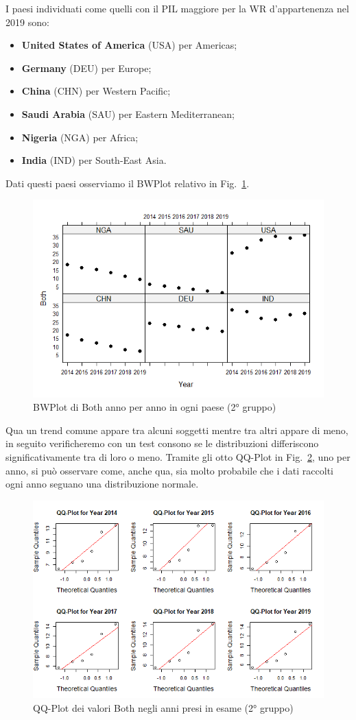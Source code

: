 \documentclass[conference]{IEEEtran}
\begin{document}
I paesi individuati come quelli con il PIL maggiore \cite{b6} per la WR
d'appartenenza nel 2019 sono:
\begin{itemize}
    \item \textbf{United States of America} (USA) per Americas;
    \item \textbf{Germany} (DEU) per Europe;
    \item \textbf{China} (CHN) per Western Pacific;
    \item \textbf{Saudi Arabia} (SAU) per Eastern Mediterranean;
    \item \textbf{Nigeria} (NGA) per Africa;
    \item \textbf{India} (IND) per South-East Asia. 
\end{itemize}
Dati questi paesi osserviamo il BWPlot relativo in Fig.~\ref{7secondgroup}.
\begin{figure}[htbp]
    \centerline{\includegraphics[width=.5\textwidth]{img/7 - Secondgroup.png}}
    \caption{BWPlot di Both anno per anno in ogni paese (2° gruppo)}
    \label{7secondgroup}
\end{figure}
Qua un trend comune appare tra alcuni soggetti mentre tra altri appare di meno,
in seguito verificheremo con un test consono se le distribuzioni differiscono significativamente
tra di loro o meno.
Tramite gli otto QQ-Plot in Fig.~\ref{8secondqq}, uno per anno, si può osservare come, anche qua,
sia molto probabile che i dati raccolti ogni anno seguano una distribuzione normale.
\begin{figure}[htbp]
    \centerline{\includegraphics[width=.5\textwidth]{img/8 - Secondqq.png}}
    \caption{QQ-Plot dei valori Both negli anni presi in esame (2° gruppo)}
    \label{8secondqq}
\end{figure}
\end{document}
